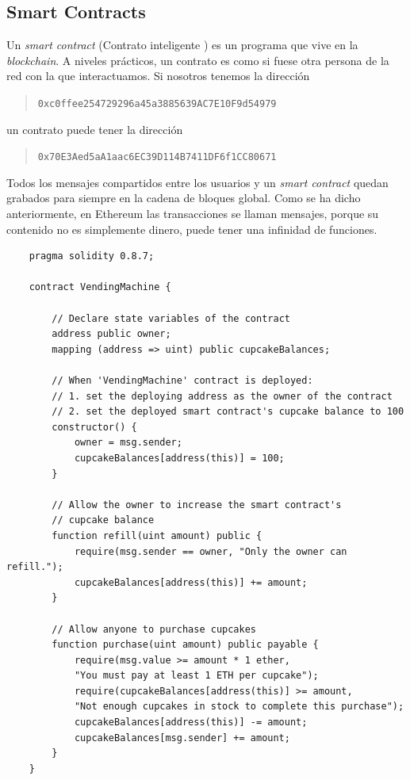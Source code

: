 \subsection{Smart Contracts}
Un \textit{smart contract} (Contrato inteligente \cite{web:scontract}) es un programa que vive en la \textit{blockchain}. A niveles prácticos, un contrato es como si fuese otra persona de la red con la que interactuamos.
Si nosotros tenemos la dirección
\begin{quote}
    \verb|0xc0ffee254729296a45a3885639AC7E10F9d54979|
\end{quote}
un contrato puede tener la dirección
\begin{quote}
    \verb|0x70E3Aed5aA1aac6EC39D114B7411DF6f1CC80671|
\end{quote}
Todos los mensajes compartidos entre los usuarios y un \textit{smart contract} quedan grabados para siempre en la cadena de bloques global. Como se ha dicho anteriormente, en Ethereum las transacciones se llaman mensajes, porque su contenido no es simplemente dinero, puede tener una infinidad de funciones.
\begin{lstlisting}
    pragma solidity 0.8.7;

    contract VendingMachine {
    
        // Declare state variables of the contract
        address public owner;
        mapping (address => uint) public cupcakeBalances;
    
        // When 'VendingMachine' contract is deployed:
        // 1. set the deploying address as the owner of the contract
        // 2. set the deployed smart contract's cupcake balance to 100
        constructor() {
            owner = msg.sender;
            cupcakeBalances[address(this)] = 100;
        }
    
        // Allow the owner to increase the smart contract's 
        // cupcake balance
        function refill(uint amount) public {
            require(msg.sender == owner, "Only the owner can refill.");
            cupcakeBalances[address(this)] += amount;
        }
    
        // Allow anyone to purchase cupcakes
        function purchase(uint amount) public payable {
            require(msg.value >= amount * 1 ether, 
            "You must pay at least 1 ETH per cupcake");
            require(cupcakeBalances[address(this)] >= amount,
            "Not enough cupcakes in stock to complete this purchase");
            cupcakeBalances[address(this)] -= amount;
            cupcakeBalances[msg.sender] += amount;
        }
    }
\end{lstlisting}
